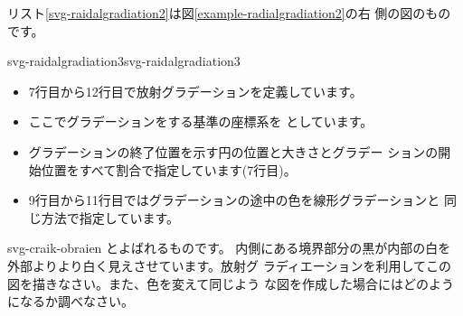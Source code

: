リスト\ref{svg-raidalgradiation2}は図\ref{example-radialgradiation2}の右
側の図のものです。

  {svg-raidalgradiation3}{svg-raidalgradiation3}
\begin{itemize}
 \item 7行目から12行目で放射グラデーションを定義しています。
 \item ここでグラデーションをする基準の座標系を
       としています。
 \item グラデーションの終了位置を示す円の位置と大きさとグラデー
       ションの開始位置をすべて割合で指定しています(7行目)。
 \item 9行目から11行目ではグラデーションの途中の色を線形グラデーションと
       同じ方法で指定しています。
\end{itemize}
{svg-craik-obraien}
{とよばれるものです。
内側にある境界部分の黒が内部の白を外部よりより白く見えさせています。放射グ
 ラディエーションを利用してこの図を描きなさい。また、色を変えて同じよう
 な図を作成した場合にはどのようになるか調べなさい。}
